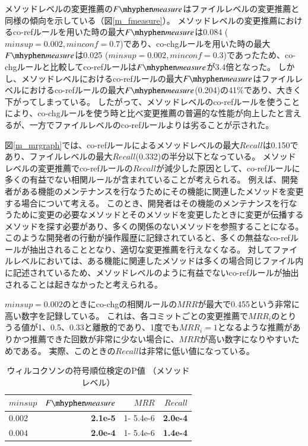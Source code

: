 \documentclass[a4paper]{jsbook}
\newcommand{\minconf}{mincon\!f}
\newcommand{\fmeasure}{F\mhyphen measure}
\begin{document}
メソッドレベルの変更推薦の$\fmeasure$はファイルレベルの変更推薦と同様の傾向を示している（図\ref{m_fmeasure}）。
メソッドレベルの変更推薦におけるco-refルールを用いた時の最大$\fmeasure$は$0.084$ ($minsup=0.002,\minconf=0.7$)であり、co-chgルールを用いた時の最大$\fmeasure$は0.025 ($minsup=0.002,\minconf=0.3$)であったため、co-chgルールと比較してco-refルールは$\fmeasure$が3.4倍となった。
しかし、メソッドレベルにおけるco-refルールの最大$\fmeasure$はファイルレベルにおけるco-refルールの最大$\fmeasure$(0.204)の41\%であり、大きく下がってしまっている。
したがって、メソッドレベルのco-refルールを使うことにより、co-chgルールを使う時と比べ変更推薦の普遍的な性能が向上したと言えるが、一方でファイルレベルのco-refルールよりは劣ることが示された。

図\ref{m_mrgraph}では、co-refルールによるメソッドレベルの最大$Recall$は0.150であり、ファイルレベルの最大$Recall$(0.332)の半分以下となっている。
メソッドレベルの変更推薦でco-refルールの$Recall$が減少した原因として、co-refルールに多くの有益でない相関ルールが含まれていることが考えられる。
例えば、開発者がある機能のメンテナンスを行なうためにその機能に関連したメソッドを変更する場合について考える。
このとき、開発者はその機能のメンテナンスを行なうために変更の必要なメソッドとそのメソッドを変更したときに変更が伝播するメソッドを探す必要があり、多くの関係のないメソッドを参照することになる。
このような開発者の行動が操作履歴に記録されていると、多くの無益なco-refルールが抽出されることとなり、適切な変更推薦を行えなくなる。
対してファイルレベルにおいては、ある機能に関連したメソッドは多くの場合同じファイル内に記述されているため、メソッドレベルのように有益でないco-refルールが抽出されることは起きなかったと考えられる。

$minsup=0.002$のときにco-chgの相関ルールの$MRR$が最大で0.455という非常に高い数字を記録している。
これは、各コミットごとの変更推薦で$MRR_i$のとりうる値が1、0.5、0.33と離散的であり、1度でも$MRR_i=1$となるような推薦がありかつ推薦できた回数が非常に少ない場合に、$MRR$が高い数字になりやすいためである。
実際、このときの$Recall$は非常に低い値になっている。

\begin{table}[t]
  \begin{center}
    \caption{ウィルコクソンの符号順位検定のP値 （メソッドレベル）}
    \label{pvalue_method}
    \begin{tabular}{l|rrr}
      \hline
      $minsup$ & $\fmeasure$ & $MRR$ & $Recall$\\
      \hline
      0.002 & {\bf 2.1e-5} & 1- 5.4e-6 & {\bf 2.0e-4}\\
      0.004 & {\bf 2.0e-4} & 1- 5.4e-6 & {\bf 1.4e-4}\\
      \hline
    \end{tabular}
  \end{center}
\end{table}
\end{document}
